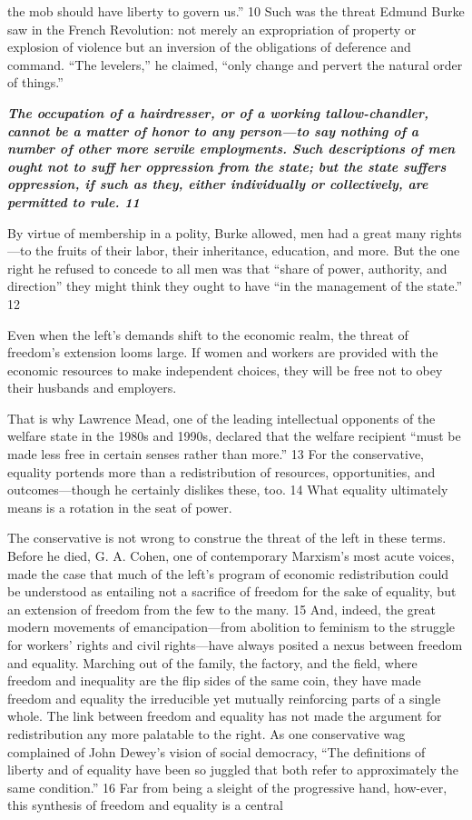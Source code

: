 the mob should have liberty to govern us.” {\color{blue} 10 } Such was the threat Edmund Burke saw in the French Revolution: not merely an expropriation of property or explosion of violence but an inversion of the obligations of deference and command. “The levelers,” he claimed, “only change and pervert the natural order of things.”{\par} {\textbf{\textit{The occupation of a hairdresser, or of a working tallow-chandler, cannot be a matter of honor to any person—to say nothing of a number of other more servile employments. Such descriptions of men ought not to suff her oppression from the state; but the state suffers oppression, if such as they, either individually or collectively, are permitted to rule. {\color{blue} 11 } } } }{\par} By virtue of membership in a polity, Burke allowed, men had a great many rights—to the fruits of their labor, their inheritance, education, and more. But the one right he refused to concede to all men was that “share of power, authority, and direction” they might think they ought to have “in the management of the state.” {\color{blue} 12 } {\par} Even when the left’s demands shift to the economic realm, the threat of freedom’s extension looms large. If women and workers are provided with the economic resources to make independent choices, they will be free not to obey their husbands and employers.{\par} That is why Lawrence Mead, one of the leading intellectual opponents of the welfare state in the 1980s and 1990s, declared that the welfare recipient “must be made less free in certain senses rather than more.” {\color{blue} 13 } For the conservative, equality portends more than a redistribution of resources, opportunities, and outcomes—though he certainly dislikes these, too. {\color{blue} 14 } What equality ultimately means is a rotation in the seat of power.{\par} The conservative is not wrong to construe the threat of the left in these terms. Before he died, G. A. Cohen, one of contemporary Marxism’s most acute voices, made the case that much of the left’s program of economic redistribution could be understood as entailing not a sacrifice of freedom for the sake of equality, but an extension of freedom from the few to the many. {\color{blue} 15 } And, indeed, the great modern movements of emancipation—from abolition to feminism to the struggle for workers’ rights and civil rights—have always posited a nexus between freedom and equality. Marching out of the family, the factory, and the field, where freedom and inequality are the flip sides of the same coin, they have made freedom and equality the irreducible yet mutually reinforcing parts of a single whole. The link between freedom and equality has not made the argument for redistribution any more palatable to the right. As one conservative wag complained of John Dewey’s vision of social democracy, “The definitions of liberty and of equality have been so juggled that both refer to approximately the same condition.” {\color{blue} 16 } Far from being a sleight of the progressive hand, how-ever, this synthesis of freedom and equality is a central 